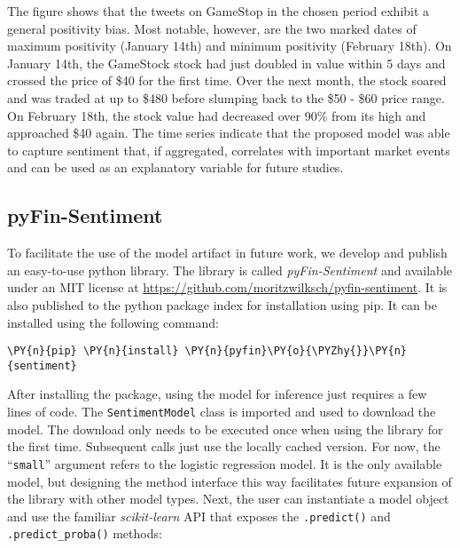 The figure shows that the tweets on GameStop in the chosen period exhibit a general positivity bias. Most notable, however, are the two marked dates of maximum positivity (January 14th) and minimum positivity (February 18th). On January 14th, the GameStock stock had just doubled in value within 5 days and crossed the price of \$40 for the first time. Over the next month, the stock soared and was traded at up to \$480 before slumping back to the \$50 - \$60 price range. On February 18th, the stock value had decreased over 90\% from its high and approached \$40 again.
The time series indicate that the proposed model was able to capture sentiment that, if aggregated, correlates with important market events and can be used as an explanatory variable for future studies.


\subsection{pyFin-Sentiment}
To facilitate the use of the model artifact in future work, we develop and publish an easy-to-use python library. The library is called \emph{pyFin-Sentiment} and available under an MIT license at \url{https://github.com/moritzwilksch/pyfin-sentiment}. It is also published to the python package index for installation using pip. It can be installed using the following command:

\begin{Verbatim}[commandchars=\\\{\}]
\PY{n}{pip} \PY{n}{install} \PY{n}{pyfin}\PY{o}{\PYZhy{}}\PY{n}{sentiment}
\end{Verbatim}

After installing the package, using the model for inference just requires a few lines of code. The \texttt{SentimentModel} class is imported and used to download the model. The download only needs to be executed once when using the library for the first time. Subsequent calls just use the locally cached version. For now, the ``\texttt{small}'' argument refers to the logistic regression model. It is the only available model, but designing the method interface this way facilitates future expansion of the library with other model types. Next, the user can instantiate a model object and use the familiar \emph{scikit-learn} API that exposes the \texttt{.predict()} and \texttt{.predict\_proba()} methods:



